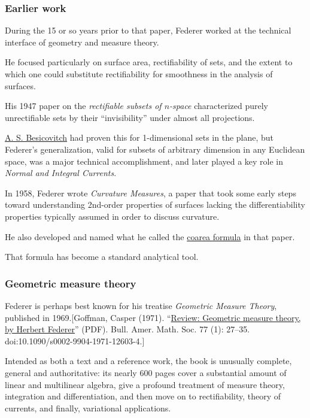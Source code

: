 \documentclass{article}
\begin{document}
\subsubsection{Earlier work}
During the 15 or so years prior to that paper, Federer worked at the technical interface of geometry and measure theory.

He focused particularly on surface area, rectifiability of sets, and the extent to which one could substitute rectifiability for smoothness in the analysis of surfaces.

His 1947 paper on the \textit{rectifiable subsets of $n$-space} characterized purely unrectifiable sets by their ``invisibility'' under almost all projections.

\href{https://en.wikipedia.org/wiki/Abram_Samoilovitch_Besicovitch}{A. S. Besicovitch} had proven this for 1-dimensional sets in the plane, but Federer's generalization, valid for subsets of arbitrary dimension in any Euclidean space, was a major technical accomplishment, and later played a key role in \textit{Normal and Integral Currents}.

%
In 1958, Federer wrote \textit{Curvature Measures}, a paper that took some early steps toward understanding 2nd-order properties of surfaces lacking the differentiability properties typically assumed in order to discuss curvature.

He also developed and named what he called the \href{https://en.wikipedia.org/wiki/Coarea_formula}{coarea formula} in that paper.

That formula has become a standard analytical tool.

\subsubsection{Geometric measure theory}
Federer is perhaps best known for his treatise \textit{Geometric Measure Theory}, published in 1969.[Goffman, Casper (1971). ``\href{http://www.ams.org/journals/bull/1971-77-01/S0002-9904-1971-12603-4/S0002-9904-1971-12603-4.pdf}{Review: Geometric measure theory, by Herbert Federer}'' (PDF). Bull. Amer. Math. Soc. 77 (1): 27--35. doi:10.1090/s0002-9904-1971-12603-4.]

Intended as both a text and a reference work, the book is unusually complete, general and authoritative: its nearly 600 pages cover a substantial amount of linear and multilinear algebra, give a profound treatment of measure theory, integration and differentiation, and then move on to rectifiability, theory of currents, and finally, variational applications.
\end{document}
